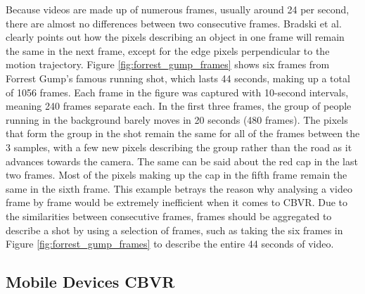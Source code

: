 \documentclass[11pt,openany,a4paper]{article}
\begin{document}
Because videos are made up of numerous frames, usually around 24 per second, there are almost no differences between two consecutive frames. Bradski et al. \cite{bradski2008opencv} clearly points out how the pixels describing an object in one frame will remain the same in the next frame, except for the edge pixels perpendicular to the motion trajectory. Figure \ref{fig:forrest_gump_frames} shows six frames from Forrest Gump's famous running shot, which lasts 44 seconds, making up a total of 1056 frames. Each frame in the figure was captured with 10-second intervals, meaning 240 frames separate each. In the first three frames, the group of people running in the background barely moves in 20 seconds (480 frames). The pixels that form the group in the shot remain the same for all of the frames between the 3 samples, with a few new pixels describing the group rather than the road as it advances towards the camera. The same can be said about the red cap in the last two frames. Most of the pixels making up the cap in the fifth frame remain the same in the sixth frame. This example betrays the reason why analysing a video frame by frame would be extremely inefficient when it comes to CBVR. Due to the similarities between consecutive frames, frames should be aggregated \cite{araujo2017i2v} to describe a shot by using a selection of frames, such as taking the six frames in Figure \ref{fig:forrest_gump_frames} to describe the entire 44 seconds of video.

\subsection{Mobile Devices CBVR}
\label{sec:mobile-cbvr-challenges}
\end{document}
